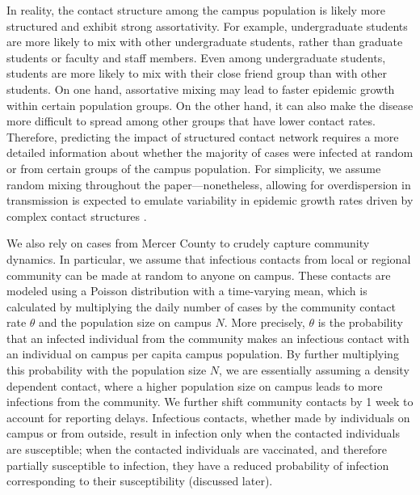\documentclass[12pt]{article}
\begin{document}
In reality, the contact structure among the campus population is likely more structured and exhibit strong assortativity.
For example, undergraduate students are more likely to mix with other undergraduate students, rather than graduate students or faculty and staff members.
Even among undergraduate students, students are more likely to mix with their close friend group than with other students.
On one hand, assortative mixing may lead to faster epidemic growth within certain population groups.
On the other hand, it can also make the disease more difficult to spread among other groups that have lower contact rates.
Therefore, predicting the impact of structured contact network requires a more detailed information about whether the majority of cases were infected at random or from certain groups of the campus population.
For simplicity, we assume random mixing throughout the paper---nonetheless, allowing for overdispersion in transmission is expected to emulate variability in epidemic growth rates driven by complex contact structures \citep{lloyd2005superspreading}.

We also rely on cases from Mercer County to crudely capture community dynamics.
In particular, we assume that infectious contacts from local or regional community can be made at random to anyone on campus.
These contacts are modeled using a Poisson distribution with a time-varying mean, which is calculated by multiplying the daily number of cases by the community contact rate $\theta$ and the population size on campus $N$.
More precisely, $\theta$ is the probability that an infected individual from the community makes an infectious contact with an individual on campus per capita campus population. 
By further multiplying this probability with the population size $N$, we are essentially assuming a density dependent contact, where a higher population size on campus leads to more infections from the community.
We further shift community contacts by 1 week to account for reporting delays.
Infectious contacts, whether made by individuals on campus or from outside, result in infection only when the contacted individuals are susceptible; when the contacted individuals are vaccinated, and therefore partially susceptible to infection, they have a reduced probability of infection corresponding to their susceptibility (discussed later).
\end{document}
